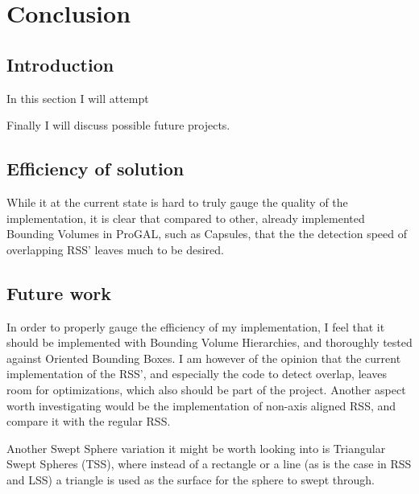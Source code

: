 
\section{Conclusion}
\label{conclusion}
\subsection{Introduction}
In this section I will attempt 

Finally I will discuss possible future projects.

\subsection{Efficiency of solution}
While it at the current state is hard to truly gauge the quality of the implementation, it is clear that compared to other, already implemented Bounding Volumes in ProGAL, such as Capsules, that the the detection speed of overlapping RSS' leaves much to be desired.

\subsection{Future work}
In order to properly gauge the efficiency of my implementation, I feel that it should be implemented with Bounding Volume Hierarchies, and thoroughly tested against Oriented Bounding Boxes. I am however of the opinion that the current implementation of the RSS', and especially the code to detect overlap, leaves room for optimizations, which also should be part of the project. Another aspect worth investigating would be the implementation of non-axis aligned RSS, and compare it with the regular RSS.

Another Swept Sphere variation it might be worth looking into is Triangular Swept Spheres (TSS), where instead of a rectangle or a line (as is the case in RSS and LSS) a triangle is used as the surface for the sphere to swept through.
